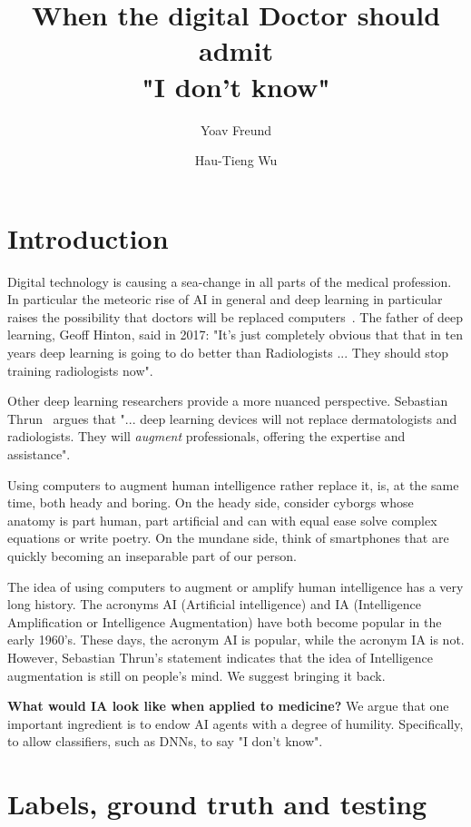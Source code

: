 \documentclass[9pt,twocolumn,twoside]{pnas-new}
\author[1]{Yoav Freund}
\author[2]{Hau-Tieng Wu}
\affil[1]{UCSD, department, city, postcode, country}
\affil[2]{Duke, department, city, postcode, country}
\title{When the digital Doctor should admit\\ "I don't know"}
\begin{document}
\maketitle

\thispagestyle{firststyle}

\section*{Introduction}

Digital technology is causing a sea-change in all parts of the medical
profession. In particular the meteoric rise of AI in general and deep
learning in particular raises the possibility that doctors will be
replaced computers~\cite{Mukherjee2017}. The father of deep learning,
Geoff Hinton, said in 2017: "It's just completely obvious that that in
ten years deep learning is going to do better than Radiologists
... They should stop training radiologists now".

Other deep learning researchers provide a more nuanced
perspective. Sebastian
Thrun~\cite{Mukherjee2017,esteva2017dermatologist} argues that
"... deep learning devices will not replace dermatologists and
radiologists. They will {\em augment} professionals, offering the
expertise and assistance".

Using computers to augment human intelligence rather replace it, is,
at the same time, both heady and boring. On the heady side, consider
cyborgs whose anatomy is part human, part artificial and can with
equal ease solve complex equations or write poetry. On the mundane
side, think of smartphones that are quickly becoming an inseparable
part of our person.
 
The idea of using computers to augment or amplify human intelligence
has a very long history. The acronyms AI (Artificial intelligence) and
IA (Intelligence Amplification or Intelligence Augmentation) have both
become popular in the early
1960's\cite{ashby1957introduction,engelbart1962augmenting}. These
days, the acronym AI is popular, while the acronym IA is not. However,
Sebastian Thrun's statement indicates that the idea of Intelligence
augmentation is still on people's mind. We suggest bringing it back.

{\bf What would IA look like when applied to medicine?} We argue that
one important ingredient is to endow AI agents with a degree of
humility. Specifically, to allow classifiers, such as DNNs, to say "I
don't know".

\section*{Labels, ground truth and testing}
\end{document}
